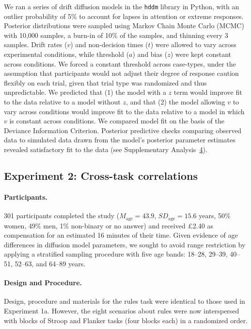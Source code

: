 \documentclass[pdflatex,sn-nature]{sn-jnl}
\begin{document}
We ran a series of drift diffusion models in the \texttt{hddm} library\cite{ref16} in Python, with an outlier probability of 5\% to account for lapses in attention or extreme responses. Posterior distributions were sampled using Markov Chain Monte Carlo (MCMC) with 10,000 samples, a burn-in of 10\% of the samples, and thinning every 3 samples. Drift rates ($v$) and non-decision times ($t$) were allowed to vary across experimental conditions, while threshold ($a$) and bias ($z$) were kept constant across conditions. We forced a constant threshold across case-types, under the assumption that participants would not adjust their degree of response caution flexibly on each trial, given that trial type was randomized and thus unpredictable. We predicted that (1) the model with a $z$ term would improve fit to the data relative to a model without $z$, and that (2) the model allowing $v$ to vary across conditions would improve fit to the data relative to a model in which $v$ is constant across conditions. We compared model fit on the basis of the Deviance Information Criterion. Posterior predictive checks comparing observed data to simulated data drawn from the model's posterior parameter estimates revealed satisfactory fit to the data (see Supplementary Analysis~\hyperref[supp:analysis4]{4}).

\subsection{Experiment 2: Cross-task correlations}\label{subsec:exp2}

\paragraph{Participants.}
301 participants completed the study ($M_\text{age} = 43.9$, $\mathit{SD}_\text{age} = 15.6$ years, 50\% women, 49\% men, 1\% non-binary or no answer) and received £2.40 as compensation for an estimated 16 minutes of their time. Given evidence of age differences in diffusion model parameters\cite{ref48}, we sought to avoid range restriction by applying a stratified sampling procedure with five age bands: 18--28, 29--39, 40--51, 52--63, and 64--89 years.

\paragraph{Design and Procedure.}
Design, procedure and materials for the rules task were identical to those used in Experiment 1a. However, the eight scenarios about rules were now interspersed with blocks of Stroop and Flanker tasks (four blocks each) in a randomized order.
\end{document}
